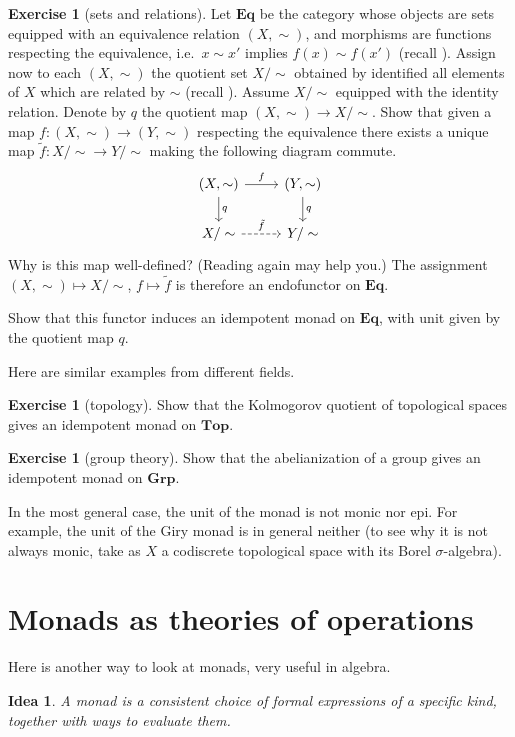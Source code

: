 \documentclass[a4paper,11pt,oneside]{scrbook}
\numberwithin{equation}{section}
\theoremstyle{plain}
\newtheorem*{idea}{Idea}
\theoremstyle{definition}
\newtheorem{ex}[thm]{Exercise}
\newcommand{\cat}[1]{{\mathbf{#1}}} %
\newcommand{\ar}[2][]{\arrow{#2}{#1}}
\newcommand{\uni}[2][]{\arrow[dashrightarrow]{#2}{#1}} %
\DeclareMathOperator{\1}{\mathbbm{1}}
\DeclareMathOperator{\2}{\mathbbm{2}}
\begin{document}
\begin{ex}[sets and relations]
 Let $\cat{Eq}$ be the category whose objects are sets equipped with an equivalence relation $(X,\sim)$, and morphisms are functions respecting the equivalence, i.e.~$x\sim x'$ implies $f(x)\sim f(x')$ (recall ).   
 Assign now to each $(X,\sim)$ the quotient set $X/\sim$ obtained by identified all elements of $X$ which are related by $\sim$ (recall ). Assume $X/\sim$ equipped with the identity relation. Denote by $q$ the quotient map $(X,\sim)\to X/\sim$.
 Show that given a map $f:(X,\sim)\to(Y,\sim)$ respecting the equivalence there exists a unique map $\tilde{f}:X/\sim\to Y/\sim$ making the following diagram commute.
 $$
 \begin{tikzcd}
  (X,\sim) \ar{d}{q} \ar{r}{f} & (Y,\sim) \ar{d}{q} \\
  X/\sim \uni{r}{\tilde{f}} & Y/\sim
 \end{tikzcd}
 $$
 Why is this map well-defined? (Reading  again may help you.)
 The assignment $(X,\sim)\mapsto X/\sim$, $f\mapsto\tilde{f}$ is therefore an endofunctor on $\cat{Eq}$.
 
 Show that this functor induces an idempotent monad on $\cat{Eq}$, with unit given by the quotient map $q$.
\end{ex}

Here are similar examples from different fields.

\begin{ex}[topology]\label{kolmogorovquotient}
 Show that the Kolmogorov quotient of topological spaces gives an idempotent monad on $\cat{Top}$.
\end{ex}

\begin{ex}[group theory]\label{abelianization}
 Show that the abelianization of a group gives an idempotent monad on $\cat{Grp}$. 
\end{ex}

In the most general case, the unit of the monad is not monic nor epi. For example, the unit of the Giry monad is in general neither (to see why it is not always monic, take as $X$ a codiscrete topological space with its Borel $\sigma$-algebra).


\section{Monads as theories of operations}

Here is another way to look at monads, very useful in algebra.
\begin{idea} 
	A monad is a consistent choice of formal expressions of a specific kind, together with ways to evaluate them. 
\end{idea}
\end{document}
